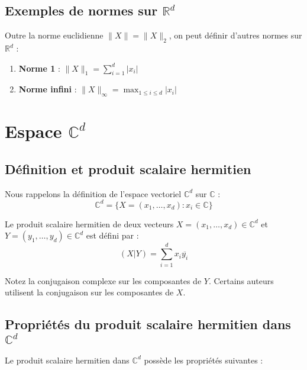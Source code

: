 \subsection{Exemples de normes sur $\mathbb{R}^d$}

Outre la norme euclidienne $\|X\| = \|X\|_2$, on peut définir d'autres normes sur $\mathbb{R}^d$ :

\begin{enumerate}
    \item \textbf{Norme 1} : $\|X\|_1 = \sum_{i=1}^d |x_i|$
    \item \textbf{Norme infini} : $\|X\|_\infty = \max_{1 \leq i \leq d} |x_i|$
\end{enumerate}


\section{Espace $\mathbb{C}^d$}

\subsection{Définition et produit scalaire hermitien}

Nous rappelons la définition de l'espace vectoriel $\mathbb{C}^d$ sur $\mathbb{C}$ :
\[
\mathbb{C}^d = \{X = (x_1, \ldots, x_d) : x_i \in \mathbb{C}\}
\]

\begin{definition}
Le produit scalaire hermitien de deux vecteurs $X = (x_1, \ldots, x_d) \in \mathbb{C}^d$ et $Y = (y_1, \ldots, y_d) \in \mathbb{C}^d$ est défini par :
\[
(X|Y) = \sum_{i=1}^d x_i \overline{y_i}
\]
\end{definition}
Notez la conjugaison complexe sur les composantes de $Y$. Certains auteurs utilisent la conjugaison sur les composantes de $X$.

\subsection{Propriétés du produit scalaire hermitien dans $\mathbb{C}^d$}

Le produit scalaire hermitien dans $\mathbb{C}^d$ possède les propriétés suivantes :

